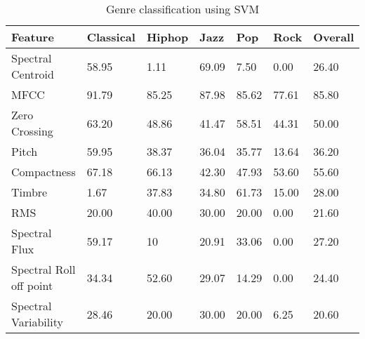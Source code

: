  \begin{table}[h!]
        \caption{Genre classification using SVM}
        \begin{center}
                \begin{tabular}{|l|l|l|l|l|l|l|}
                        \hline

                      Feature 
                      &
                        Classical
                        &
                        Hiphop
                        &
                        Jazz
                        &
                        Pop
                        &
                        Rock
                        &
                        Overall
                        \\\hline
                        Spectral Centroid
                        &
                        58.95
                        &
                        1.11
                        &
                        69.09
                        &
                        7.50
                        &
                        0.00
                        &
                        26.40
\\
\hline
MFCC
&
91.79
&
85.25
&
87.98
&
85.62
&
77.61
&
85.80
\\
\hline

Zero Crossing
&
63.20
&
48.86
&
41.47
&
58.51
&
44.31
&
50.00
\\
\hline

Pitch
&
59.95
&
38.37
&
36.04
&
35.77
&
13.64
&
36.20
\\
\hline

Compactness
&
67.18
&
66.13
&
42.30
&
47.93
&
53.60
&
55.60
\\
\hline

Timbre
&
1.67
&
37.83
&
34.80
&
61.73
&
15.00
&
28.00
\\
\hline

RMS
&
20.00
&
40.00
&
30.00
&
20.00
&
0.00
&
21.60
\\\hline

Spectral Flux
&
59.17
&
10
&
20.91
&
33.06
&
0.00
&
27.20
\\\hline

Spectral Roll off point
&
34.34
&
52.60
&
29.07
&
14.29
&
0.00
&
24.40
\\\hline

Spectral Variability
&
28.46
&
20.00
&
30.00
&
20.00
&
6.25
&
20.60
\\\hline
                 \end{tabular}
        \end{center}
\end{table}

